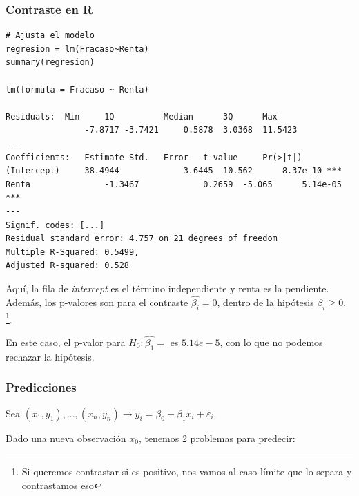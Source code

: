 \subsubsection{Contraste en R}

\label{example:R-output}
\begin{lstlisting}[style=mystyle]
# Ajusta el modelo
regresion = lm(Fracaso~Renta)
summary(regresion)

lm(formula = Fracaso ~ Renta)

Residuals:	Min		1Q			Median		3Q		Max
				-7.8717 -3.7421		0.5878	3.0368	11.5423
---
Coefficients:	Estimate Std.	Error 	t-value		Pr(>|t|)
(Intercept)		38.4944				3.6445	10.562		8.37e-10 ***
Renta 				-1.3467				0.2659	-5.065		5.14e-05 ***
---
Signif. codes: [...]
Residual standard error: 4.757 on 21 degrees of freedom
Multiple R-Squared: 0.5499,
Adjusted R-squared: 0.528
\end{lstlisting}


Aquí, la fila de \textit{intercept} es el término independiente y renta es la pendiente. Además, los p-valores son para el contraste $\hat{β_i} = 0$, dentro de la hipótesis $β_i \geq 0$. \footnote{Si queremos contrastar si es positivo, nos vamos al caso límite que lo separa y contrastamos eso}.

En este caso, el p-valor para $H_0: \hat{β_1}=$ es $5.14e-5$, con lo que no podemos rechazar la hipótesis.


\subsubsection{Predicciones}

Sea $(x_1,y_1),...,(x_n,y_n) \to y_i = β_0 + β_1x_i + ε_i$.

Dado una nueva observación $x_0$, tenemos 2 problemas para predecir:


